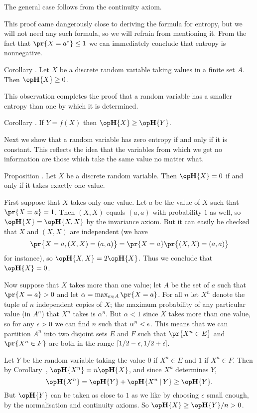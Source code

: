The general case follows from the continuity axiom.\slug

This proof came dangerously close to deriving the formula for entropy, but we will not need any such formula,
so we will refrain from mentioning it.
From the fact that $\pr\{X = a^*\} \le 1$ we can immediately conclude that entropy is nonnegative.

\edef\corentropynonneg{\the\sectcount.\the\thmcount}
\proclaim Corollary \advthm. Let $X$ be a discrete random variable taking values in a finite
set $A$. Then $\Eta\{X\} \ge 0$.\slug

This observation completes the proof that a random variable has a smaller entropy than one by which
it is determined.

\edef\cordetermines{\the\sectcount.\the\thmcount}
\proclaim Corollary \advthm. If $Y = f(X)$ then $\Eta\{X\} \ge \Eta\{Y\}$.\slug

Next we show that a random variable has zero entropy if and only if it is constant.
This reflects the idea that the variables from which we get no information are those which take
the same value no matter what.

\proclaim Proposition \advthm. Let $X$ be a discrete random variable.
Then $\Eta\{X\} = 0$ if and only if it takes exactly one value.

\proof First suppose that $X$ takes only one value.
Let $a$ be the value of $X$ such that $\pr\{X=a\} = 1$.
Then $(X,X)$ equals $(a,a)$ with probability $1$ as well,
so $\Eta\{X\} = \Eta\{X,X\}$ by the invariance axiom. But it can easily be checked that
$X$ and $(X,X)$ are independent (we have
$$\pr\bigl\{X = a, (X,X)= (a,a)\bigr\} = \pr\{X = a\}\pr\bigl\{(X,X) = (a,a)\bigr\}$$
for instance), so $\Eta\{X,X\} = 2\Eta\{X\}$. Thus we conclude
that $\Eta\{X\} = 0$.

Now suppose that $X$ takes more than one value; let $A$ be the set of $a$ such that
$\pr\{X = a\} > 0$ and let $\alpha = \max_{a\in A} \pr\{X = a\}$. For all $n$ let $X^n$ denote
the tuple of $n$ independent copies of $X$; the maximum probability of any particular value (in $A^n$)
that $X^n$ takes is $\alpha^n$. But $\alpha < 1$ since $X$ takes more than one value, so for any
$\epsilon > 0$ we can find $n$ such that $\alpha^n < \epsilon$. This means that we can partition $A^n$ into
two disjoint sets $E$ and $F$ such that $\pr\{X^n \in E\}$ and $\pr\{X^n \in F\}$ are both
in the range $[1/2-\epsilon, 1/2+\epsilon]$.

Let $Y$ be the random variable taking the value $0$ if $X^n\in E$ and $1$ if $X^n\in F$. Then
by Corollary~{\corxn}, $\Eta\{X^n\} = n\Eta\{X\}$, and since $X^n$ determines $Y$,
$$\Eta\{X^n\} = \Eta\{Y\} + \Eta\{X^n\given Y\} \ge \Eta\{Y\}.$$
But $\Eta\{Y\}$ can be taken as close to $1$ as we like by choosing $\epsilon$ small enough,
by the normalisation and continuity axioms. So
$\Eta\{X\} \ge \Eta\{Y\}/n > 0$.\slug

